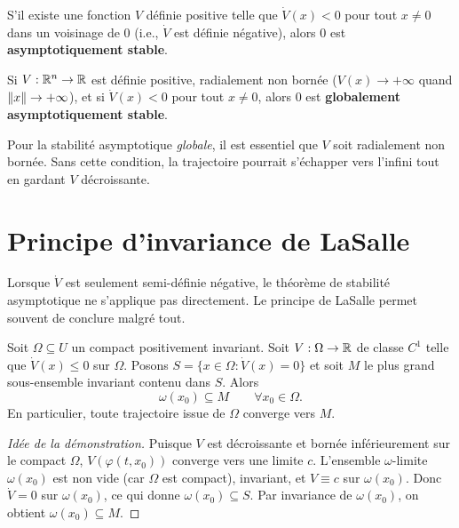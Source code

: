 \begin{theoreme}
\label{thm:lyap-asymptotic}
S'il existe une fonction $V$ d\'efinie positive telle que $\dot{V}(x) < 0$
pour tout $x \neq 0$ dans un voisinage de $0$ (i.e., $\dot{V}$ est
d\'efinie n\'egative), alors $0$ est \textbf{asymptotiquement stable}.
\end{theoreme}

\begin{theoreme}
\label{thm:barbashin}
Si $V : \mathbb{R}^n \to \mathbb{R}$ est d\'efinie positive, radialement non born\'ee
($V(x) \to +\infty$ quand $\left\| x \right\| \to +\infty$), et si $\dot{V}(x) < 0$
pour tout $x \neq 0$, alors $0$ est \textbf{globalement asymptotiquement stable}.
\end{theoreme}

\begin{attention}[title=\textbf{Fonctions de Lyapunov non born\'ees}]
Pour la stabilit\'e asymptotique \emph{globale}, il est essentiel que $V$ soit
radialement non born\'ee. Sans cette condition, la trajectoire pourrait
s'\'echapper vers l'infini tout en gardant $V$ d\'ecroissante.
\end{attention}

\section{Principe d'invariance de LaSalle}

Lorsque $\dot{V}$ est seulement semi-d\'efinie n\'egative, le th\'eor\`eme de
stabilit\'e asymptotique ne s'applique pas directement. Le principe de LaSalle
permet souvent de conclure malgr\'e tout.

\begin{theoreme}
\label{thm:lasalle}
Soit $\Omega \subseteq U$ un compact positivement invariant. Soit
$V : \Omega \to \mathbb{R}$ de classe $C^1$ telle que $\dot{V}(x) \leq 0$ sur $\Omega$.
Posons $S = \{x \in \Omega : \dot{V}(x) = 0\}$ et soit $M$ le plus grand
sous-ensemble invariant contenu dans $S$. Alors
\[
    \omega(x_0) \subseteq M \qquad \forall x_0 \in \Omega.
\]
En particulier, toute trajectoire issue de $\Omega$ converge vers $M$.
\end{theoreme}

\begin{proof}[Id\'ee de la d\'emonstration]
Puisque $V$ est d\'ecroissante et born\'ee inf\'erieurement sur le compact $\Omega$,
$V(\varphi(t, x_0))$ converge vers une limite $c$. L'ensemble $\omega$-limite
$\omega(x_0)$ est non vide (car $\Omega$ est compact), invariant, et
$V \equiv c$ sur $\omega(x_0)$. Donc $\dot{V} = 0$ sur $\omega(x_0)$,
ce qui donne $\omega(x_0) \subseteq S$. Par invariance de $\omega(x_0)$,
on obtient $\omega(x_0) \subseteq M$.
\end{proof}

